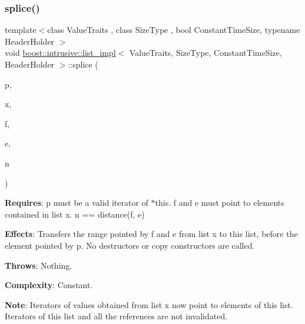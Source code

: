 \subsubsection{\texorpdfstring{splice()}{splice()}\hspace{0.1cm}{\footnotesize\ttfamily [4/4]}}
{\footnotesize\ttfamily template$<$class Value\+Traits , class Size\+Type , bool Constant\+Time\+Size, typename Header\+Holder $>$ \\
void \hyperlink{classboost_1_1intrusive_1_1list__impl}{boost\+::intrusive\+::list\+\_\+impl}$<$ Value\+Traits, Size\+Type, Constant\+Time\+Size, Header\+Holder $>$\+::splice (\begin{DoxyParamCaption}\item[{const\+\_\+iterator}]{p,  }\item[{\hyperlink{classboost_1_1intrusive_1_1list__impl}{list\+\_\+impl}$<$ Value\+Traits, Size\+Type, Constant\+Time\+Size, Header\+Holder $>$ \&}]{x,  }\item[{const\+\_\+iterator}]{f,  }\item[{const\+\_\+iterator}]{e,  }\item[{size\+\_\+type}]{n }\end{DoxyParamCaption})\hspace{0.3cm}{\ttfamily [inline]}}

{\bfseries Requires}\+: p must be a valid iterator of $\ast$this. f and e must point to elements contained in list x. n == distance(f, e)

{\bfseries Effects}\+: Transfers the range pointed by f and e from list x to this list, before the element pointed by p. No destructors or copy constructors are called.

{\bfseries Throws}\+: Nothing.

{\bfseries Complexity}\+: Constant.

{\bfseries Note}\+: Iterators of values obtained from list x now point to elements of this list. Iterators of this list and all the references are not invalidated. \mbox{\label{classboost_1_1intrusive_1_1list__impl_a08187766526ac474bc92fe5103fb8f7b}} 
